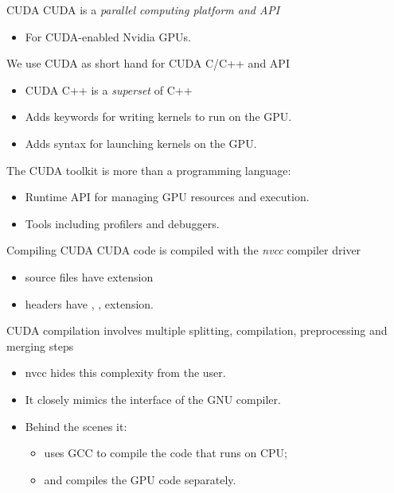 \documentclass[aspectratio=43]{beamer}
\begin{document}
\begin{frame}[fragile]{CUDA}
    CUDA is a \emph{parallel computing platform and API}
    \begin{itemize}
        \item For CUDA-enabled Nvidia GPUs.
    \end{itemize}
    We use CUDA as short hand for CUDA C/C++ and API
    \begin{itemize}
        \item CUDA C++ is a \emph{superset} of C++
        \item Adds keywords for writing kernels to run on the GPU.
        \item Adds syntax for launching kernels on the GPU.
    \end{itemize}
    The CUDA toolkit is more than a programming language:
    \begin{itemize}
        \item Runtime API for managing GPU resources and execution.
        \item Tools including profilers and debuggers.
    \end{itemize}
\end{frame}

\begin{frame}[fragile]{Compiling CUDA}
    CUDA code is compiled with the \emph{nvcc} compiler driver
    \begin{itemize}
        \item source files have  extension
        \item headers have , ,  extension.
    \end{itemize}
    CUDA compilation involves multiple splitting, compilation, preprocessing and merging steps
    \begin{itemize}
        \item nvcc hides this complexity from the user.
        \item It closely mimics the interface of the GNU compiler.
        \item Behind the scenes it:
        \begin{itemize}
            \item uses GCC to compile the code that runs on CPU;
            \item and compiles the GPU code separately.
        \end{itemize}
    \end{itemize}
\end{frame}
\end{document}
